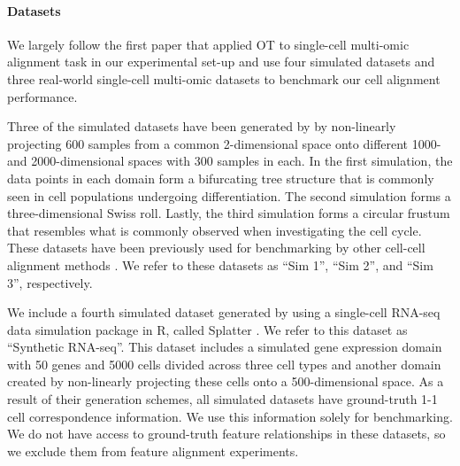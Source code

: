 \paragraph{Datasets} We largely follow the first paper that applied OT to
single-cell multi-omic alignment task \citep{Demetci20} in our experimental set-up and
use four simulated datasets and three real-world single-cell multi-omic datasets to benchmark
our cell alignment performance.

Three of the simulated datasets have been generated by
\citep{liu_et_al:LIPIcs:2019:11040} by non-linearly projecting 600 samples from a common
2-dimensional space onto different 1000- and 2000-dimensional spaces with 300 samples in each.
In the first simulation, the data points in each domain form a bifurcating tree structure
that is commonly seen in cell populations undergoing differentiation. The second simulation
forms a three-dimensional Swiss roll. Lastly, the third simulation forms a circular frustum
that resembles what is commonly observed when investigating the cell cycle.
These datasets have been previously used for benchmarking by other cell-cell alignment methods
\citep{liu_et_al:LIPIcs:2019:11040,singh20,cao2020unsupervised, Pamona,Demetci20}.
We refer to these datasets as ``Sim 1'', ``Sim 2'', and ``Sim 3'', respectively.

We include a fourth simulated dataset generated by \citep{Demetci20} using a single-cell RNA-seq
data simulation package in R, called Splatter \citep{zappia2017splatter}.
We refer to this dataset as ``Synthetic RNA-seq''. This dataset includes a simulated gene expression
domain with 50 genes and 5000 cells divided across three cell types and another domain created
by non-linearly projecting these cells onto a 500-dimensional space. As a result of
their generation schemes, all simulated datasets have ground-truth 1-1 cell
correspondence information. We use this information solely for benchmarking.
We do not have access to ground-truth feature relationships in these datasets,
so we exclude them from feature alignment experiments.

